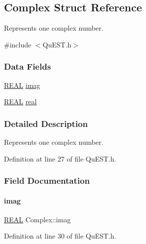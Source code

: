 \hypertarget{structComplex}{}\subsection{Complex Struct Reference}
\label{structComplex}


Represents one complex number.  




{\ttfamily \#include $<$Qu\+E\+S\+T.\+h$>$}

\subsubsection*{Data Fields}
\begin{DoxyCompactItemize}
\item 
\mbox{\hyperlink{QuEST__precision_8h_a4b654506f18b8bfd61ad2a29a7e38c25}{R\+E\+AL}} \mbox{\hyperlink{structComplex_a1151948284b21c0052f203f23ab931d9}{imag}}
\item 
\mbox{\hyperlink{QuEST__precision_8h_a4b654506f18b8bfd61ad2a29a7e38c25}{R\+E\+AL}} \mbox{\hyperlink{structComplex_a479ad939835457595fcca3ca55c06283}{real}}
\end{DoxyCompactItemize}


\subsubsection{Detailed Description}
Represents one complex number. 

Definition at line 27 of file Qu\+E\+S\+T.\+h.



\subsubsection{Field Documentation}
\mbox{\label{structComplex_a1151948284b21c0052f203f23ab931d9}} 
\paragraph{\texorpdfstring{imag}{imag}}
{\footnotesize\ttfamily \mbox{\hyperlink{QuEST__precision_8h_a4b654506f18b8bfd61ad2a29a7e38c25}{R\+E\+AL}} Complex\+::imag}



Definition at line 30 of file Qu\+E\+S\+T.\+h.




